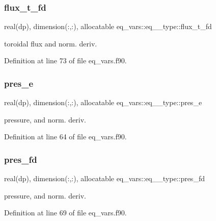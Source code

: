 \subsubsection{\texorpdfstring{flux\+\_\+t\+\_\+fd}{flux\_t\_fd}}
{\footnotesize\ttfamily real(dp), dimension(\+:,\+:), allocatable eq\+\_\+vars\+::eq\+\_\+\_\+type\+::flux\+\_\+t\+\_\+fd}



toroidal flux and norm. deriv. 



Definition at line 73 of file eq\+\_\+vars.\+f90.

\mbox{\label{structeq__vars_1_1eq__1__type_a203223883a300a3617bca2683bc5292d}} 
\subsubsection{\texorpdfstring{pres\+\_\+e}{pres\_e}}
{\footnotesize\ttfamily real(dp), dimension(\+:,\+:), allocatable eq\+\_\+vars\+::eq\+\_\+\_\+type\+::pres\+\_\+e}



pressure, and norm. deriv. 



Definition at line 64 of file eq\+\_\+vars.\+f90.

\mbox{\label{structeq__vars_1_1eq__1__type_a8f13d5b0d7375b769334d2863291d0a2}} 
\subsubsection{\texorpdfstring{pres\+\_\+fd}{pres\_fd}}
{\footnotesize\ttfamily real(dp), dimension(\+:,\+:), allocatable eq\+\_\+vars\+::eq\+\_\+\_\+type\+::pres\+\_\+fd}



pressure, and norm. deriv. 



Definition at line 69 of file eq\+\_\+vars.\+f90.

